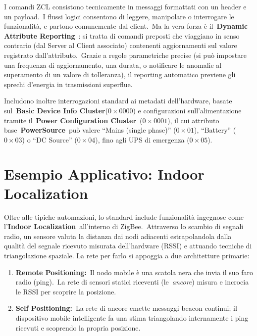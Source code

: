 \documentclass[
  italian,
  openany]{book}
\begin{document}
I comandi ZCL consistono tecnicamente in messaggi formattati con un
header e un payload.~I flussi logici consentono di leggere, manipolare o
interrogare le funzionalità, e partono comunemente dal client.~Ma la
vera forza è il~\textbf{Dynamic Attribute Reporting}~: si tratta di
comandi preposti che viaggiano in senso contrario (dal Server al Client
associato) contenenti aggiornamenti sul valore registrato
dall'attributo.~Grazie a regole parametriche precise (si può impostare
una frequenza di aggiornamento, una durata, o notificare le anomalie al
superamento di un valore di tolleranza), il reporting automatico
previene gli sprechi d'energia in trasmissioni superflue.

Includono inoltre interrogazioni standard ai metadati dell'hardware,
basate sul~\textbf{Basic Device Info Cluster}(\(0\times0000\)) e
configurazioni sull'alimentazione tramite il~\textbf{Power Configuration
Cluster}~(\(0\times0001\)), il cui attributo
base~\textbf{PowerSource}~può valere ``Mains (single phase)''
(\(0\times01\)), ``Battery'' (\(0\times03\)) o ``DC Source''
(\(0\times04\)), fino agli UPS di emergenza (\(0\times05\)).

\section{Esempio Applicativo: Indoor
Localization}\label{esempio-applicativo-indoor-localization}

Oltre alle tipiche automazioni, lo standard include funzionalità
ingegnose come l'\textbf{Indoor Localization}~all'interno di
ZigBee.~Attraverso lo scambio di segnali radio, un sensore valuta la
distanza dai nodi adiacenti estrapolandola dalla qualità del segnale
ricevuto misurata dell'hardware (RSSI) e attuando tecniche di
triangolazione spaziale. La rete per farlo si appoggia a due
architetture primarie:

\begin{enumerate}
\def\labelenumi{\arabic{enumi}.}
\item
  \textbf{Remote Positioning:}~Il nodo mobile è una scatola nera che
  invia il suo faro radio (ping).~La rete di sensori statici riceventi
  (le~\emph{ancore}) misura e incrocia le RSSI per scoprire la
  posizione.
\item
  \textbf{Self Positioning:}~La rete di ancore emette messaggi beacon
  continui; il dispositivo mobile intelligente fa una stima triangolando
  internamente i ping ricevuti e scoprendo la propria posizione.
\end{enumerate}
\end{document}
